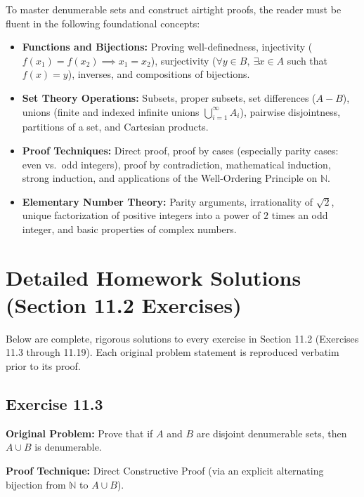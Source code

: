 \documentclass[11pt, letterpaper]{article}
\theoremstyle{definition}
\theoremstyle{remark}
\begin{document}
To master denumerable sets and construct airtight proofs, the reader must be fluent in the following foundational concepts:
\begin{itemize}
    \item \textbf{Functions and Bijections:} Proving well-definedness, injectivity ($f(x_1) = f(x_2) \implies x_1 = x_2$), surjectivity ($\forall y \in B,\ \exists x \in A$ such that $f(x) = y$), inverses, and compositions of bijections.
    \item \textbf{Set Theory Operations:} Subsets, proper subsets, set differences ($A - B$), unions (finite and indexed infinite unions $\bigcup_{i=1}^{\infty} A_i$), pairwise disjointness, partitions of a set, and Cartesian products.
    \item \textbf{Proof Techniques:} Direct proof, proof by cases (especially parity cases: even vs.\ odd integers), proof by contradiction, mathematical induction, strong induction, and applications of the Well-Ordering Principle on $\mathbb{N}$.
    \item \textbf{Elementary Number Theory:} Parity arguments, irrationality of $\sqrt{2}$, unique factorization of positive integers into a power of $2$ times an odd integer, and basic properties of complex numbers.
\end{itemize}

\section{Detailed Homework Solutions (Section 11.2 Exercises)}

Below are complete, rigorous solutions to every exercise in Section 11.2 (Exercises 11.3 through 11.19). Each original problem statement is reproduced verbatim prior to its proof.

\subsection{Exercise 11.3}

\textbf{Original Problem:} Prove that if $A$ and $B$ are disjoint denumerable sets, then $A \cup B$ is denumerable.

\textbf{Proof Technique:} Direct Constructive Proof (via an explicit alternating bijection from $\mathbb{N}$ to $A \cup B$).
\end{document}
